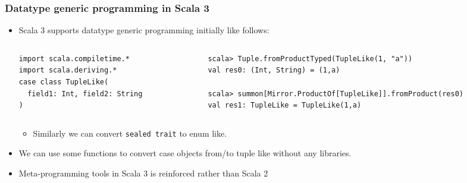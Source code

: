 \begin{frame}[fragile]
  \frametitle{Datatype generic programming in Scala 3}

  \begin{itemize}
    \item Scala 3 supports datatype generic programming initially like follows:
    \begin{columns}
      \begin{column}{0.32\textwidth}
\begin{lstlisting}[style=scala]
import scala.compiletime.*
import scala.deriving.*
case class TupleLike(
  field1: Int, field2: String
)
\end{lstlisting}
      \end{column}
      \begin{column}{0.6\textwidth}
\begin{lstlisting}[style=scala]
scala> Tuple.fromProductTyped(TupleLike(1, "a"))
val res0: (Int, String) = (1,a)

scala> summon[Mirror.ProductOf[TupleLike]].fromProduct(res0)
val res1: TupleLike = TupleLike(1,a)
\end{lstlisting}
      \end{column}
    \end{columns}
    \begin{itemize}
      \item Similarly we can convert \lstinline|sealed trait| to enum like.
    \end{itemize}

    \item We can use some functions to convert case objects from/to tuple like without any libraries.

    \item Meta-programming tools in Scala 3 is reinforced rather than Scala 2
  \end{itemize}

\end{frame}


